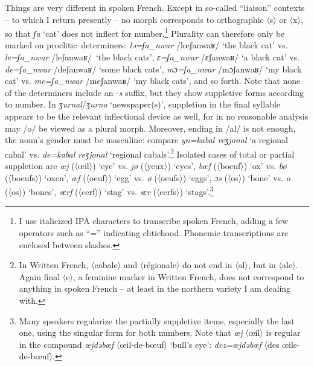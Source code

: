 \documentclass[output=paper]{langscibook}
\begin{document}
Things are very different in spoken French. Except in so-called “liaison” contexts -- to which I return presently -- no morph corresponds to orthographic 〈s〉 or 〈x〉, so that \textit{ʃa} ‘cat’ does not inflect for number.\footnote{I use italicized IPA characters to transcribe spoken French, adding a few operators such as “=” indicating clitichood. Phonemic transcriptions are enclosed between slashes.} Plurality can therefore only be marked on proclitic~determiners: \textit{lə=ʃa\_nwar} /lœʃanwaʁ/ ‘the black cat’ vs. \textit{le=ʃa\_nwar} /leʃanwaʁ/~‘the black cats’, \textit{ɛ=ʃa\_nwar} /ɛʃanwaʁ/ ‘a black cat’ vs. \textit{de=ʃa\_nwar} /deʃanwaʁ/ ‘some black cats’, \textit{mɔ=ʃa\_nwar} /mɔʃanwaʁ/ ‘my black cat’ vs. \textit{me=ʃa\_nwar} /meʃanwaʁ/ ‘my black cats’, and so forth. Note that none of the determiners include an -\textit{s} suffix, but they show suppletive forms according to number. In \textit{ʒurnal}\slash\textit{ʒurno} ‘newspaper(s)’, suppletion in the final syllable appears to be the relevant inflectional device as well, for in no reasonable analysis may /o/ be viewed as a plural morph. Moreover, ending in /al/ is not enough, the noun’s gender must be masculine: compare \textit{yn=kabal reʒjonal} ‘a regional cabal’ vs. \textit{de=kabal reʒjonal} ‘regional cabals’.\footnote{In Written French, 〈cabale〉 and 〈régionale〉 do not end in 〈al〉, but in 〈ale〉. Again final 〈e〉, a feminine marker in Written French, does not correspond to anything in spoken French – at least in the northern variety I am dealing with.} Isolated cases of total or partial suppletion are \textit{œj} (〈œil〉) ‘eye’ vs. \textit{jø} (〈yeux〉) ‘eyes’, \textit{bœf} (〈boeuf〉) ‘ox’ vs. \textit{bø} (〈boeufs〉) ‘oxen’, \textit{œf} (〈oeuf〉) ‘egg’ vs. \textit{ø} (〈oeufs〉) ‘eggs’, \textit{ɔs} (〈os〉) ‘bone’ vs. \textit{o} (〈os〉) ‘bones’, \textit{sɛrf} (〈cerf〉) ‘stag’ vs. \textit{sɛr} (〈cerfs〉) ‘stags’.\footnote{Many speakers regularize the partially suppletive items, especially the last one, using the singular form for both numbers. Note that \textit{œj} 〈œil〉 is regular in the compound \textit{œjdəbœf} 〈œil-de-bœuf〉 ‘bull’s eye’: \textit{dez=œjdəbœf} 〈des œils-de-bœuf〉.}
\end{document}
